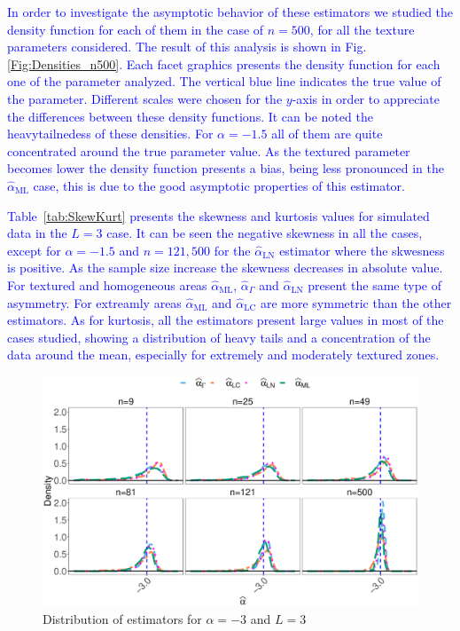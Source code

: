 \documentclass[twocolumn]{svjour3}
\begin{document}
\textcolor{blue}{
In order to investigate the asymptotic behavior of these estimators we studied the density function for each of them in the case of $n=500$, for all the texture parameters considered. The result of this analysis is shown in Fig.\ref{Fig:Densities_n500}. Each facet graphics presents the density function for each one of the parameter analyzed. The vertical blue line indicates the true value of the parameter. Different scales were chosen for the $y$-axis in order to appreciate the differences between these density functions. It can be noted the heavytailnedess of these densities. For $\alpha=-1.5$ all of them are quite concentrated around the true parameter value. As the textured parameter becomes lower the density function presents a bias, being less pronounced in the $\widehat{\alpha}_{\text{{ML}}}$ case, this is due to the good asymptotic properties of this estimator.      
}

\textcolor{blue}{
	Table~\ref{tab:SkewKurt} presents the skewness and kurtosis values for simulated data in the $L=3$ case. It can be seen the negative skewness in all the cases, except for $\alpha=-1.5$ and $n=121,500$ for the $\widehat{\alpha}_{\text{{LN}}}$ estimator where the skwesness is positive. As the sample size increase the skewness decreases in absolute value. For textured and homogeneous areas $\widehat{\alpha}_{\text{{ML}}}$, $\widehat{\alpha}_{\Gamma}$ and $\widehat{\alpha}_{\text{{LN}}}$ present the same type of asymmetry. For extreamly areas $\widehat{\alpha}_{\text{{ML}}}$ and $\widehat{\alpha}_{\text{{LC}}}$ are more symmetric than the other estimators.
}
\textcolor{blue}{
	As for kurtosis, all the estimators present large values in most of the cases studied, showing a distribution of heavy tails and a concentration of the data around the mean, especially for extremely and moderately textured zones.
}
\begin{figure}[hbt]
	\centering
	\includegraphics[width=1\linewidth]{../../../Figures/PaperTesis/DensidadEstimadorNoCont.eps}
	\caption{\label{Fig:DistributionL=3_alfa=-3} Distribution of estimators for $\alpha=-3$ and  $L=3$ }\label{Fig:DistEstimator}
\end{figure}
\end{document}

